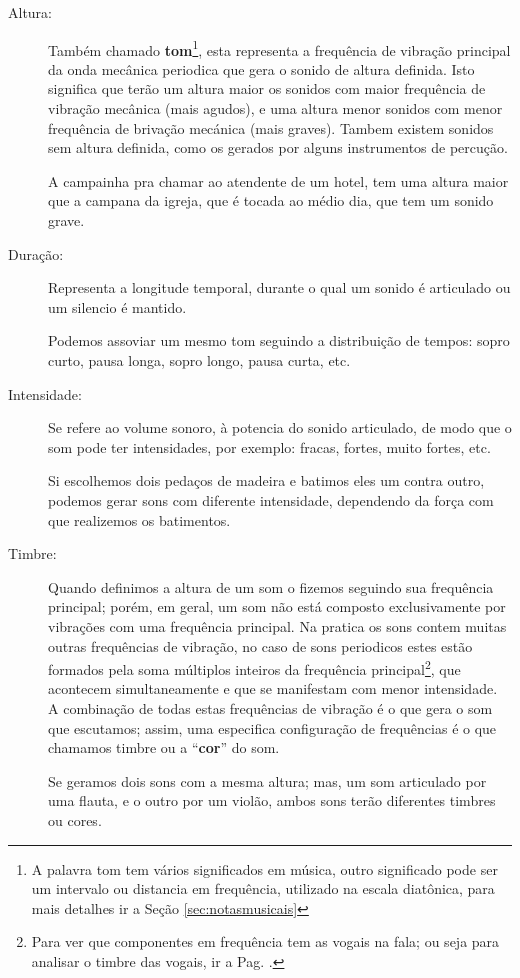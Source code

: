\begin{description}
\item [Altura:] \label{sec:pos:Altura} 
Também chamado \textbf{tom}\footnote{A palavra tom tem vários significados em música, 
outro significado pode ser um intervalo ou distancia em frequência, 
utilizado na escala diatônica, para mais detalhes ir a Seção \ref{sec:notasmusicais}}, 
esta representa a frequência de vibração principal da onda 
mecânica periodica que gera o sonido de altura definida.
Isto significa que terão um altura maior os sonidos com maior frequência de vibração mecânica (mais agudos), 
e uma altura menor sonidos com menor frequência de brivação mecánica (mais graves).
Tambem existem sonidos sem altura definida, como os gerados por alguns instrumentos de percução.
\begin{example}
A campainha pra chamar ao atendente de um hotel, 
tem uma altura maior que a campana da igreja, 
que é tocada ao médio dia, que tem um sonido grave.
\end{example} 
\item [Duração:] \label{sec:pos:Duracion}
Representa a longitude temporal, 
durante o qual um sonido é articulado ou um silencio é mantido.
\begin{example}
Podemos assoviar um mesmo tom seguindo a distribuição de tempos: 
sopro curto, pausa longa, sopro longo, pausa curta, etc.
\end{example} 
\item [Intensidade:] \label{sec:pos:Intensidade}
Se refere ao volume sonoro, à potencia do sonido articulado, 
de modo que o som pode ter intensidades, por exemplo: fracas, fortes, muito fortes, etc.  
\begin{example}
Si escolhemos dois pedaços de madeira e batimos eles um contra outro, 
podemos gerar sons com diferente intensidade, dependendo da força com que realizemos os batimentos.
\end{example} 
\item [Timbre:] \label{sec:pos:timbre}
Quando definimos a altura de um som o fizemos seguindo sua frequência principal;
porém, em geral, um som não está composto exclusivamente por vibrações com uma frequência principal.
Na pratica os sons contem muitas outras frequências de vibração,
no caso de sons periodicos estes estão formados pela soma 
múltiplos inteiros da frequência principal\footnote{Para 
ver que componentes em frequência tem as vogais na fala;
ou seja para analisar o timbre das vogais, ir a Pag. \pageref{fig:timbresvocais}.}, 
que acontecem simultaneamente e 
que se manifestam com menor intensidade.
A combinação de todas estas frequências de vibração é o que gera o som que escutamos;
assim, uma especifica configuração de frequências é o que chamamos timbre ou
a ``\textbf{cor}'' do som.
\begin{example}
Se geramos dois sons com a mesma altura; mas, um som articulado por uma flauta,
e o outro por um violão, ambos sons terão diferentes timbres ou cores.
\end{example} 
\end{description}
